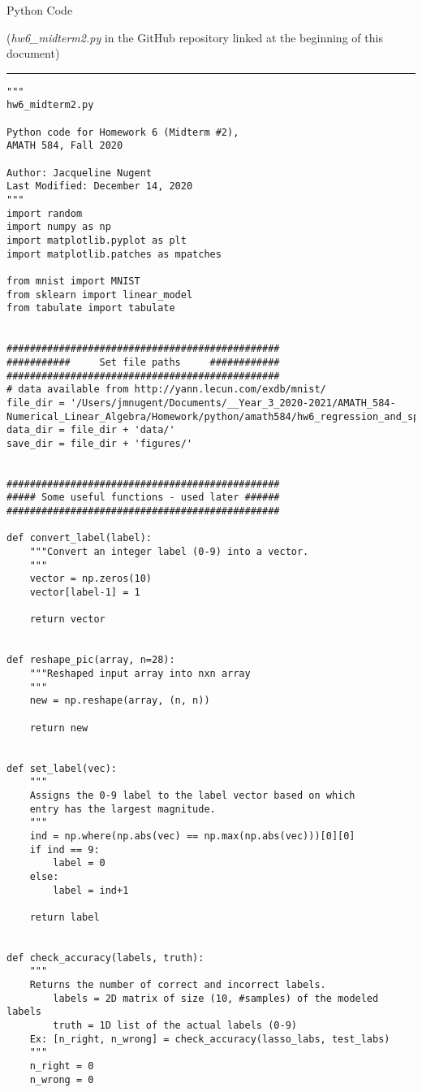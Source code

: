 \documentclass[10pt]{article}
\begin{document}
\centerline{\Large{Python Code}}
\centerline{(\small{\textit{hw6\_midterm2.py} in the GitHub repository linked at the beginning of this document)}}
\vskip 10pt
\hrule


\begin{lstlisting}     
"""
hw6_midterm2.py

Python code for Homework 6 (Midterm #2),
AMATH 584, Fall 2020

Author: Jacqueline Nugent 
Last Modified: December 14, 2020
"""
import random
import numpy as np
import matplotlib.pyplot as plt
import matplotlib.patches as mpatches

from mnist import MNIST
from sklearn import linear_model
from tabulate import tabulate


###############################################
###########     Set file paths     ############
###############################################
# data available from http://yann.lecun.com/exdb/mnist/
file_dir = '/Users/jmnugent/Documents/__Year_3_2020-2021/AMATH_584-Numerical_Linear_Algebra/Homework/python/amath584/hw6_regression_and_sparsity/'
data_dir = file_dir + 'data/'
save_dir = file_dir + 'figures/'


###############################################
##### Some useful functions - used later ######
###############################################

def convert_label(label):
    """Convert an integer label (0-9) into a vector.
    """
    vector = np.zeros(10)
    vector[label-1] = 1

    return vector


def reshape_pic(array, n=28):
    """Reshaped input array into nxn array
    """
    new = np.reshape(array, (n, n))
    
    return new


def set_label(vec):
    """
    Assigns the 0-9 label to the label vector based on which
    entry has the largest magnitude.
    """
    ind = np.where(np.abs(vec) == np.max(np.abs(vec)))[0][0]
    if ind == 9:
        label = 0
    else:
        label = ind+1
    
    return label


def check_accuracy(labels, truth):
    """
    Returns the number of correct and incorrect labels.
        labels = 2D matrix of size (10, #samples) of the modeled labels
        truth = 1D list of the actual labels (0-9)
    Ex: [n_right, n_wrong] = check_accuracy(lasso_labs, test_labs)
    """
    n_right = 0
    n_wrong = 0
    

\end{lstlisting}
\end{document}
